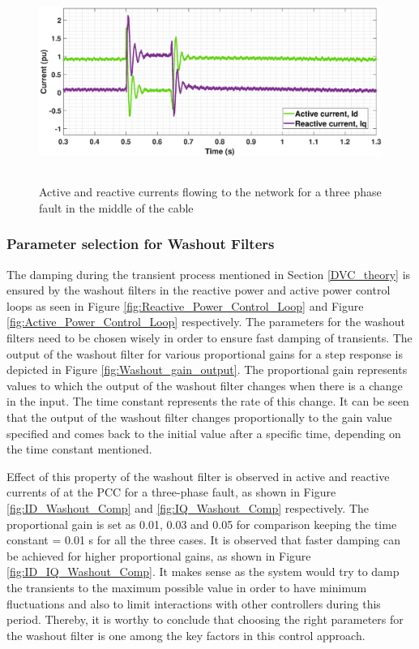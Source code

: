 \begin{figure}[H]
    \includegraphics[height = 6.5cm,width = \textwidth]{Diagrams/Chapter_3/ID_IQ_Final_3.eps}
    \caption{Active and reactive currents flowing to the network for a three phase fault in the middle of the cable}
    \label{fig:ID_IQ_Final_3}
\end{figure}


\subsubsection{Parameter selection for Washout Filters}\label{para_selection_washout}
The damping during the transient process mentioned in Section \ref{DVC_theory} is ensured by the washout filters in the reactive power and active power control loops as seen in Figure \ref{fig:Reactive_Power_Control_Loop} and Figure \ref{fig:Active_Power_Control_Loop} respectively. The parameters for the washout filters need to be chosen wisely in order to ensure fast damping of transients. The output of the washout filter for various proportional gains for a step response is depicted in Figure \ref{fig:Washout_gain_output}. The proportional gain represents values to which the output of the washout filter changes when there is a change in the input. The time constant represents the rate of this change. It can be seen that the output of the washout filter changes proportionally to the gain value specified and comes back to the initial value after a specific time, depending on the time constant mentioned.


Effect of this property of the washout filter is observed in active and reactive currents of at the \gls{PCC} for a three-phase fault, as shown in Figure \ref{fig:ID_Washout_Comp} and \ref{fig:IQ_Washout_Comp} respectively. The proportional gain is set as 0.01, 0.03 and 0.05 for comparison keeping the time constant = 0.01 s for all the three cases. It is observed that faster damping can be achieved for higher proportional gains, as shown in Figure \ref{fig:ID_IQ_Washout_Comp}. It makes sense as the system would try to damp the transients to the maximum possible value in order to have minimum fluctuations and also to limit interactions with other controllers during this period. Thereby, it is worthy to conclude that choosing the right parameters for the washout filter is one among the key factors in this control approach.

